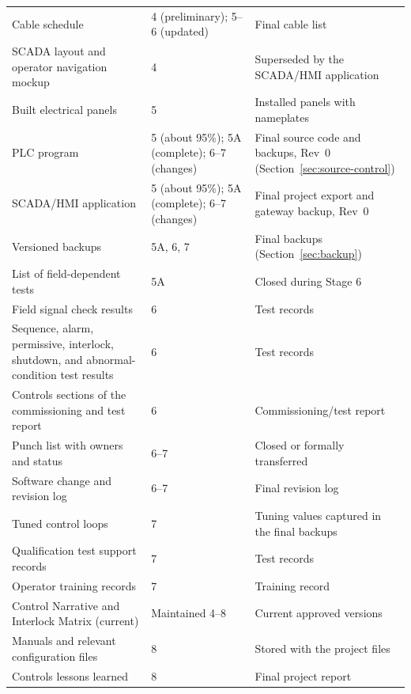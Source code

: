 \begin{longtable}{@{}P{5.62cm}P{4.65cm}P{6.66cm}@{}}
Cable schedule & 4 (preliminary); 5--6 (updated) & Final cable list \\
SCADA layout and operator navigation mockup & 4 & Superseded by the SCADA/HMI application \\
Built electrical panels & 5 & Installed panels with nameplates \\
PLC program & 5 (about 95\%); 5A (complete); 6--7 (changes) & Final source code and backups, Rev~0 (Section~\ref{sec:source-control}) \\
SCADA/HMI application & 5 (about 95\%); 5A (complete); 6--7 (changes) & Final project export and gateway backup, Rev~0 \\
Versioned backups & 5A, 6, 7 & Final backups (Section~\ref{sec:backup}) \\
List of field-dependent tests & 5A & Closed during Stage 6 \\
Field signal check results & 6 & Test records \\
Sequence, alarm, permissive, interlock, shutdown, and abnormal-condition test results & 6 & Test records \\
Controls sections of the commissioning and test report & 6 & Commissioning/test report \\
Punch list with owners and status & 6--7 & Closed or formally transferred \\
Software change and revision log & 6--7 & Final revision log \\
Tuned control loops & 7 & Tuning values captured in the final backups \\
Qualification test support records & 7 & Test records \\
Operator training records & 7 & Training record \\
Control Narrative and Interlock Matrix (current) & Maintained 4--8 & Current approved versions \\
Manuals and relevant configuration files & 8 & Stored with the project files \\
Controls lessons learned & 8 & Final project report \\
\bottomrule
\end{longtable}

